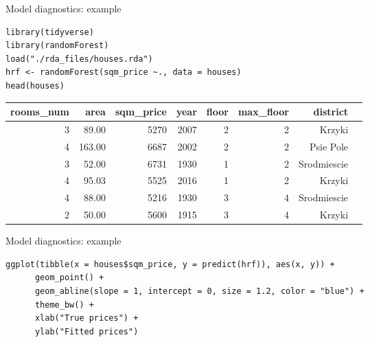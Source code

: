 \documentclass[xcolor={dvipsnames}]{beamer}
\begin{document}
\begin{frame}[fragile]{Model diagnostics: example}

		\begin{lstlisting}
library(tidyverse)
library(randomForest)
load("./rda_files/houses.rda")
hrf <- randomForest(sqm_price ~., data = houses)
head(houses)
		\end{lstlisting}
		\begin{table}[ht]
			\centering
			\begin{tabular}{rrrrrrrl}
				\hline
				 rooms\_num & area & sqm\_price & year & floor & max\_floor & district \\ 
				\hline
				  3 & 89.00 & 5270 & 2007 &   2 &   2 & Krzyki \\ 
				  4 & 163.00 & 6687 & 2002 &   2 &   2 & Psie Pole \\ 
				  3 & 52.00 & 6731 & 1930 &   1 &   2 & Srodmiescie \\ 
				  4 & 95.03 & 5525 & 2016 &   1 &   2 & Krzyki \\ 
				  4 & 88.00 & 5216 & 1930 &   3 &   4 & Srodmiescie \\ 
				  2 & 50.00 & 5600 & 1915 &   3 &   4 & Krzyki \\ 
				\hline
			\end{tabular}
		\end{table}
\end{frame}

\begin{frame}[fragile]{Model diagnostics: example}
	\begin{lstlisting}
ggplot(tibble(x = houses$sqm_price, y = predict(hrf)), aes(x, y)) +
	  geom_point() +
	  geom_abline(slope = 1, intercept = 0, size = 1.2, color = "blue") +
	  theme_bw() +
	  xlab("True prices") +
	  ylab("Fitted prices")
	\end{lstlisting}
\end{frame}
\end{document}
